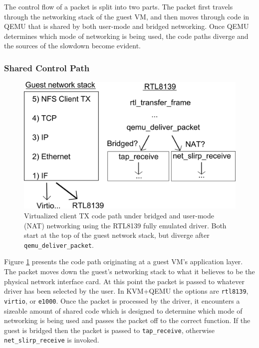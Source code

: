 The control flow of a packet is split into two parts.
The packet first travels through the networking stack of the guest VM, and then moves through code in QEMU that is shared by both user-mode and bridged networking.
Once QEMU determines which mode of networking is being used, the code paths diverge and the sources of the slowdown become evident.

\subsubsection{Shared Control Path}
\begin{figure}[!ht]
	\centering
		\includegraphics[scale=0.6]{codepath1}
	\caption{Virtualized client TX code path under bridged and user-mode (NAT) networking using the RTL8139 fully emulated driver. Both start at the top of the guest network stack, but diverge after \texttt{qemu\_deliver\_packet}.}
	\label{fig:codepath1}
\end{figure}

Figure \ref{fig:codepath1} presents the code path originating at a guest VM's application layer.
The packet moves down the guest's networking stack to what it believes to be the physical network interface card.
At this point the packet is passed to whatever driver has been selected by the user.
In KVM+QEMU the options are \texttt{rtl8139}, \texttt{virtio}, or \texttt{e1000}.
Once the packet is processed by the driver, it encounters a sizeable amount of shared code which is designed to determine which mode of networking is being used and passes the packet off to the
correct function.
If the guest is bridged then the packet is passed to \texttt{tap\_receive}, otherwise \texttt{net\_slirp\_receive} is invoked.

